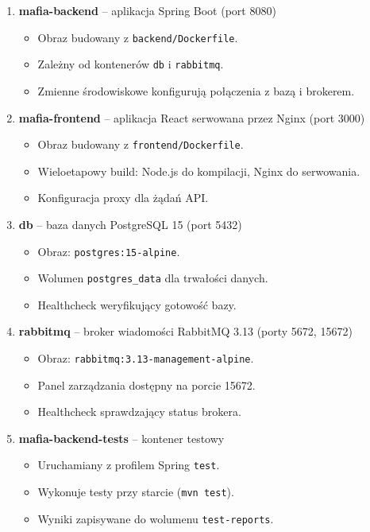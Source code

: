 ﻿\documentclass[a4paper,twoside,11pt]{mwrep}
\theoremstyle{plain} \newtheorem{thm}{Twierdzenie}
\theoremstyle{plain} \newtheorem{lem}{Lemat}
\theoremstyle{definition} \newtheorem{defn}{Definicja}
\theoremstyle{remark} \newtheorem*{rem}{Wniosek}
\begin{document}
\begin{enumerate}
    \item \textbf{mafia-backend} -- aplikacja Spring Boot (port 8080)
    \begin{itemize}
        \item Obraz budowany z \texttt{backend/Dockerfile}.
        \item Zależny od kontenerów \texttt{db} i \texttt{rabbitmq}.
        \item Zmienne środowiskowe konfigurują połączenia z bazą i brokerem.
    \end{itemize}
    
    \item \textbf{mafia-frontend} -- aplikacja React serwowana przez Nginx (port 3000)
    \begin{itemize}
        \item Obraz budowany z \texttt{frontend/Dockerfile}.
        \item Wieloetapowy build: Node.js do kompilacji, Nginx do serwowania.
        \item Konfiguracja proxy dla żądań API.
    \end{itemize}
    
    \item \textbf{db} -- baza danych PostgreSQL 15 (port 5432)
    \begin{itemize}
        \item Obraz: \texttt{postgres:15-alpine}.
        \item Wolumen \texttt{postgres\_data} dla trwałości danych.
        \item Healthcheck weryfikujący gotowość bazy.
    \end{itemize}
    
    \item \textbf{rabbitmq} -- broker wiadomości RabbitMQ 3.13 (porty 5672, 15672)
    \begin{itemize}
        \item Obraz: \texttt{rabbitmq:3.13-management-alpine}.
        \item Panel zarządzania dostępny na porcie 15672.
        \item Healthcheck sprawdzający status brokera.
    \end{itemize}
    
    \item \textbf{mafia-backend-tests} -- kontener testowy
    \begin{itemize}
        \item Uruchamiany z profilem Spring \texttt{test}.
        \item Wykonuje testy przy starcie (\texttt{mvn test}).
        \item Wyniki zapisywane do wolumenu \texttt{test-reports}.
    \end{itemize}
\end{enumerate}
\end{document}
